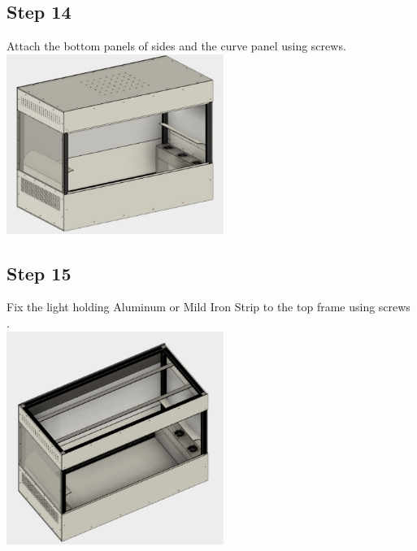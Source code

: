 \documentclass[a4paper,12pt,oneside]{book}
\begin{document}
\subsection*{Step 14}
Attach the bottom panels of sides and the curve panel using screws.\\
\includegraphics[width=200pt]{14}
\subsection*{Step 15}
Fix the light holding Aluminum or Mild Iron Strip to the top frame using screws .\\
\includegraphics[width=200pt]{15}
\end{document}
